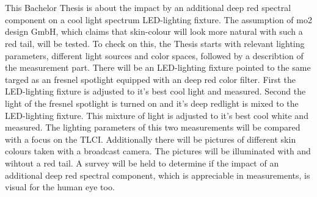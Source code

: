 \section*{\centering\abstractname}
This Bachelor Thesis is about the impact by an additional deep red spectral component on a cool light spectrum LED-lighting fixture. The assumption of mo2 design GmbH, which claims that skin-colour will look more natural with such a \glqq red tail\grqq , will be tested. To check on this, the Thesis starts with relevant lighting parameters, different light sources and color spaces, followed by a describtion of the measurement part. There will be an LED-lighting fixture pointed to the same targed as an fresnel spotlight equipped with an deep red color filter. First the LED-lighting fixture is adjusted to it's best cool light and measured. Second the light of the fresnel spotlight is turned on and it's deep redlight is mixed to the LED-lighting fixture. This mixture of light is adjusted to it's best cool white and measured. The lighting parameters of this two measurements will be compared with a focus on the TLCI.
Additionally there will be pictures of different skin colours taken with a broadcast camera. The pictures will be illuminated with and wihtout a \glqq red tail\grqq . A survey will be held to determine if the impact of an additional deep red spectral component, which is appreciable in measurements, is visual for the human eye too.
 
\section*{\centering\abstractname}

